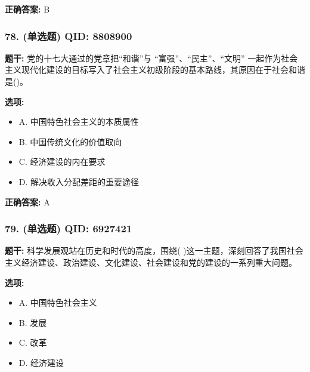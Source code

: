 \documentclass[12pt,UTF8]{ctexart}
\begin{document}
\textbf{正确答案:}
B

\vspace{0.3em}\hrulefill\vspace{0.7em}

\subsubsection*{78. (单选题) \small QID: 8808900}

\textbf{题干:}
党的十七大通过的党章把“和谐”与 “富强”、“民主”、“文明” 一起作为社会主义现代化建设的目标写入了社会主义初级阶段的基本路线，其原因在于社会和谐是()。

\textbf{选项:}
\begin{itemize}[leftmargin=*]

  \item A. 中国特色社会主义的本质属性

  \item B. 中国传统文化的价值取向

  \item C. 经济建设的内在要求

  \item D. 解决收入分配差距的重要途径

\end{itemize}

\textbf{正确答案:}
A

\vspace{0.3em}\hrulefill\vspace{0.7em}

\subsubsection*{79. (单选题) \small QID: 6927421}

\textbf{题干:}
科学发展观站在历史和时代的高度，围绕(  )这一主题，深刻回答了我国社会主义经济建设、政治建设、文化建设、社会建设和党的建设的一系列重大问题。

\textbf{选项:}
\begin{itemize}[leftmargin=*]

  \item A. 中国特色社会主义

  \item B. 发展

  \item C. 改革

  \item D. 经济建设

\end{itemize}
\end{document}
